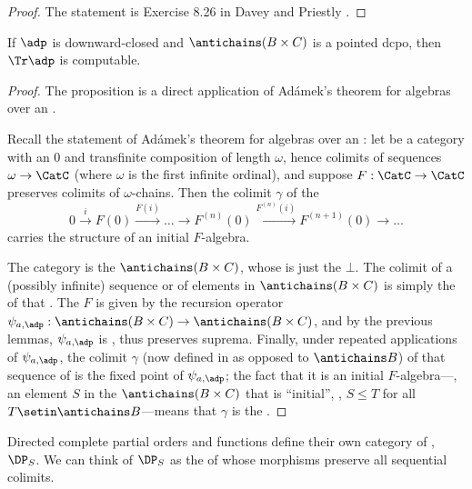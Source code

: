\begin{proof}
    The statement is Exercise 8.26 in Davey and Priestly \citeXXX.
\end{proof}




\begin{proposition}
    If $\adp$ is downward-closed and $\antichains (B \times C)$ is a pointed dcpo, then $\Tr \adp$ is computable.
\end{proposition}

\begin{proof}
    The proposition is a direct application of Ad\'amek's theorem for algebras over an .

    Recall the statement of Ad\'amek's theorem for algebras over an : let \CatC be a category with an  $0$ and transfinite composition of length $\omega$, hence colimits of sequences $\omega \to \CatC$ (where $\omega$ is the first infinite ordinal), and suppose $F: \CatC \to \CatC$ preserves colimits of $\omega$-chains.
    Then the colimit $\gamma$ of the  \begin{equation}
        0 \overset{i}{\to} F(0) \overset{F(i)}{\to} \ldots \to F^{(n)}(0) \overset{F^{(n)}(i)}{\to} F^{(n+1)}(0) \to \ldots
    \end{equation}
    carries the structure of an initial $F$-algebra.

    The category \CatC is the  $\antichains (B \times C)$, whose  is just the  $\bot$.
    The colimit of a (possibly infinite) sequence or  of elements in $\antichains (B\times C)$ is simply the  of that .
    The  $F$ is given by the recursion operator $\psi_{a,\adp} : \antichains (B\times C) \to \antichains (B\times C)$, and by the previous lemmas, $\psi_{a,\adp}$ is , thus preserves suprema.
    Finally, under repeated applications of $\psi_{a,\adp}$, the colimit $\gamma$ (now defined in \Pos as opposed to $\antichains B$) of that sequence of  is the fixed point of $\psi_{a,\adp}$; the fact that it is an initial $F$-algebra---\ie,  an element $S$ in the  $\antichains (B\times C)$ that is ``initial'', \ie,  $S \leq T$ for all $T \setin \antichains B$---means that $\gamma$ is the .
\end{proof}
Directed complete partial orders and  functions define their own category of , $\DP_S$.
We can think of $\DP_S$ as the  of \DP whose morphisms preserve all sequential colimits.

